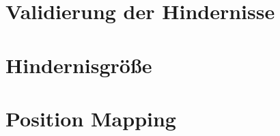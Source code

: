 \section{Validierung der Hindernisse}
\label{sec:validation}

\section{Hindernisgröße}
\label{sec:hindernisgroesse}

\section{Position Mapping}
\label{sec:position_mapping}

